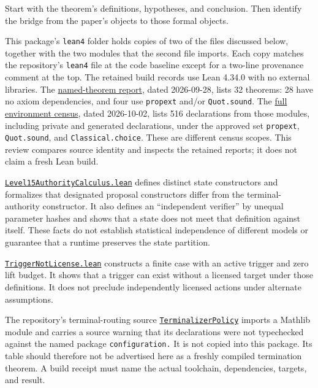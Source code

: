 \documentclass[
  11pt,
]{article}
\newcommand{\passthrough}[1]{#1}
\begin{document}
Start with the theorem's definitions, hypotheses, and conclusion. Then
identify the bridge from the paper's objects to those formal objects.

This package's \passthrough{\lstinline!lean4!} folder holds copies of
two of the files discussed below, together with the two modules that the
second file imports. Each copy matches the repository's
\passthrough{\lstinline!lean4!} file at the code baseline except for a
two-line provenance comment at the top. The retained build records use
Lean 4.34.0 with no external libraries. The
\href{lean4/axiom_report.txt}{named-theorem report}, dated 2026-09-28,
lists 32 theorems: 28 have no axiom dependencies, and four use
\passthrough{\lstinline!propext!} and/or
\passthrough{\lstinline!Quot.sound!}. The
\href{lean4/full_axiom_report.txt}{full environment census}, dated
2026-10-02, lists 516 declarations from those modules, including private
and generated declarations, under the approved set
\passthrough{\lstinline!propext!}, \passthrough{\lstinline!Quot.sound!},
and \nolinkurl{Classical.choice}. These are different census scopes.
This review compares source identity and inspects the retained reports;
it does not claim a fresh Lean build.

\href{lean4/Level15AuthorityCalculus.lean}{\mbox{\nolinkurl{Level15AuthorityCalculus.lean}}}
defines distinct state constructors and formalizes that designated
proposal constructors differ from the terminal-authority constructor. It
also defines an ``independent verifier'' by unequal parameter hashes and
shows that a state does not meet that definition against itself. These
facts do not establish statistical independence of different models or
guarantee that a runtime preserves the state partition.

\href{lean4/TriggerNotLicense.lean}{\mbox{\nolinkurl{TriggerNotLicense.lean}}}
constructs a finite case with an active trigger and zero lift budget. It
shows that a trigger can exist without a licensed target under those
definitions. It does not preclude independently licensed actions under
alternate assumptions.

The repository's terminal-routing source
\href{https://github.com/dbccpage/the_symbol_game/blob/52cb5457f6c485ba548cfd292f6012a941ed22cf/lean4/TerminalizerPolicy.lean}{\nolinkurl{TerminalizerPolicy}}
imports a Mathlib module and carries a source warning that its
declarations were not typechecked against the named package
\nolinkurl{configuration.} It is not copied into this package. Its table
should therefore not be advertised here as a freshly compiled
termination theorem. A build receipt must name the actual toolchain,
dependencies, targets, and result.
\end{document}
